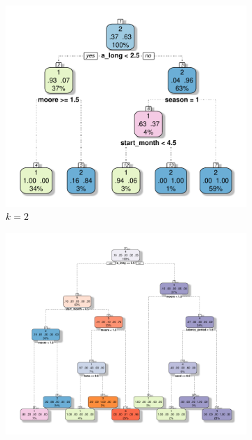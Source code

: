 \documentclass[10pt]{article}
\theoremstyle{definition}
\begin{document}
\begin{figure}[ht]
\centering
\begin{subfigure}[b]{.47\textwidth}
\includegraphics[width=\textwidth]{../clustering/results/kmeans/cart_kmeans_2.pdf}
\caption{$k=2$}
\end{subfigure}
\begin{subfigure}[b]{.47\textwidth}
\includegraphics[width=\textwidth]{../clustering/results/kmeans/cart_kmeans_5.pdf}

\end{subfigure}
\end{figure}
\end{document}
